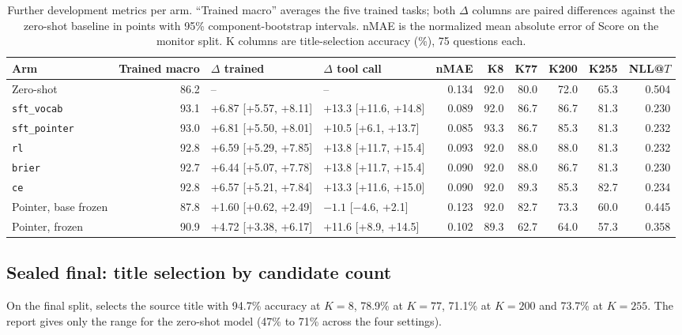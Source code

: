 \begin{table}[h]
\centering
\small
\caption{Further development metrics per arm. ``Trained macro'' averages the five trained
tasks; both $\Delta$ columns are paired differences against the zero-shot baseline in points
with 95\% component-bootstrap intervals. nMAE is the normalized mean absolute error of Score
on the monitor split. K columns are title-selection accuracy (\%), 75 questions each.}
\label{tab:arms_more}
\setlength{\tabcolsep}{3.5pt}
\begin{adjustbox}{max width=\linewidth}
\begin{tabular}{@{}lrllrrrrrr@{}}
\toprule
Arm & Trained macro & $\Delta$ trained & $\Delta$ tool call & nMAE & K8 & K77 & K200 & K255 & NLL@$T$ \\
\midrule
Zero-shot & 86.2 & -- & -- & 0.134 & 92.0 & 80.0 & 72.0 & 65.3 & 0.504 \\
\texttt{sft\_vocab} & 93.1 & +6.87 [+5.57, +8.11] & +13.3 [+11.6, +14.8] & 0.089 & 92.0 & 86.7 & 86.7 & 81.3 & 0.230 \\
\texttt{sft\_pointer} & 93.0 & +6.81 [+5.50, +8.01] & +10.5 [+6.1, +13.7] & 0.085 & 93.3 & 86.7 & 85.3 & 81.3 & 0.232 \\
\texttt{rl} & 92.8 & +6.59 [+5.29, +7.85] & +13.8 [+11.7, +15.4] & 0.093 & 92.0 & 88.0 & 88.0 & 81.3 & 0.232 \\
\texttt{brier} & 92.7 & +6.44 [+5.07, +7.78] & +13.8 [+11.7, +15.4] & 0.090 & 92.0 & 88.0 & 86.7 & 81.3 & 0.230 \\
\texttt{ce} & 92.8 & +6.57 [+5.21, +7.84] & +13.3 [+11.6, +15.0] & 0.090 & 92.0 & 89.3 & 85.3 & 82.7 & 0.234 \\
Pointer, base frozen & 87.8 & +1.60 [+0.62, +2.49] & $-1.1$ [$-4.6$, +2.1] & 0.123 & 92.0 & 82.7 & 73.3 & 60.0 & 0.445 \\
Pointer, \expone{} frozen & 90.9 & +4.72 [+3.38, +6.17] & +11.6 [+8.9, +14.5] & 0.102 & 89.3 & 62.7 & 64.0 & 57.3 & 0.358 \\
\bottomrule
\end{tabular}
\end{adjustbox}
\end{table}

\subsection{Sealed final: title selection by candidate count}

On the final split, \expone{} selects the source title with 94.7\% accuracy at $K=8$, 78.9\% at
$K=77$, 71.1\% at $K=200$ and 73.7\% at $K=255$. The report gives only the range for the
zero-shot model (47\% to 71\% across the four settings).

